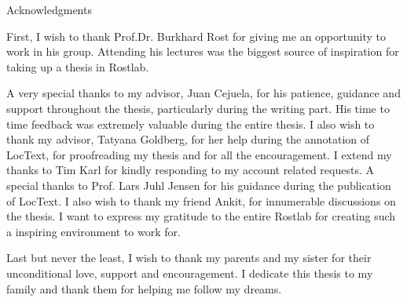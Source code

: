 \thispagestyle{empty}

\vspace*{2cm}

\begin{center}
{ Acknowledgments}
\end{center}

\vspace{1cm}

First, I wish to thank Prof.Dr. Burkhard Rost for giving me an opportunity to work in his group. Attending his lectures was the biggest source of inspiration for taking up a thesis in Rostlab. 

A very special thanks to my advisor, Juan Cejuela, for his patience, guidance and support throughout the thesis, particularly during the writing part. His time to time feedback was extremely valuable during the entire thesis. I also wish to thank my advisor, Tatyana Goldberg, for her help during the annotation of LocText, for proofreading my thesis and for all the encouragement. I extend my thanks to Tim Karl for kindly responding to my account related requests. A special thanks to Prof. Lars Juhl Jensen for his guidance during the publication of LocText. I also wish to thank my friend Ankit, for innumerable discussions on the thesis. I want to express my gratitude to the entire Rostlab for creating such a inspiring environment to work for.

Last but never the least, I wish to thank my parents and my sister for their unconditional love, support and encouragement. I dedicate this thesis to my family and thank them for helping me follow my dreams.


\cleardoublepage{}

